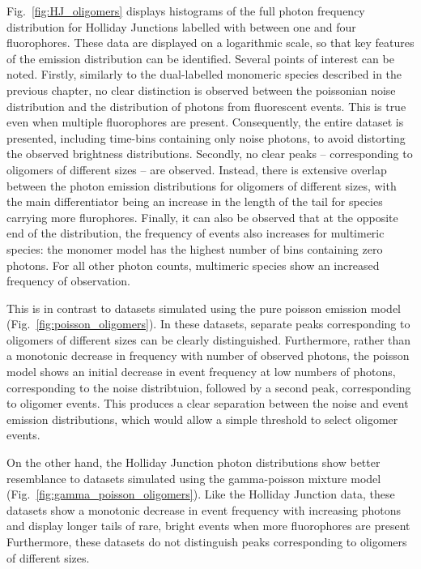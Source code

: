 Fig.~\ref{fig:HJ_oligomers} displays histograms of the full photon frequency distribution for Holliday Junctions labelled with between one and four fluorophores. These data are displayed on a logarithmic scale, so that key features of the emission distribution can be identified. Several points of interest can be noted. Firstly, similarly to the dual-labelled monomeric species described in the previous chapter, no clear distinction is observed between the poissonian noise distribution and the distribution of photons from fluorescent events. This is true even when multiple fluorophores are present. Consequently, the entire dataset is presented, including time-bins containing only noise photons, to avoid distorting the observed brightness distributions. Secondly, no clear peaks -- corresponding to oligomers of different sizes -- are observed. Instead, there is extensive overlap between the photon emission distributions for oligomers of different sizes, with the main differentiator being an increase in the length of the tail for species carrying more flurophores. Finally, it can also be observed that at the opposite end of the distribution, the frequency of events also increases for multimeric species: the monomer model has the highest number of bins containing zero photons. For all other photon counts, multimeric species show an increased frequency of observation. 

This is in contrast to datasets simulated using the pure poisson emission model (Fig.~\ref{fig:poisson_oligomers}). In these datasets, separate peaks corresponding to oligomers of different sizes can be clearly distinguished. Furthermore, rather than a monotonic decrease in frequency with number of observed photons, the poisson model shows an initial decrease in event frequency at low numbers of photons, corresponding to the noise distribtuion, followed by a second peak, corresponding to oligomer events. This produces a clear separation between the noise and event emission distributions, which would allow a simple threshold to select oligomer events. 

On the other hand, the Holliday Junction photon distributions show better resemblance to datasets simulated using the gamma-poisson mixture model (Fig.~\ref{fig:gamma_poisson_oligomers}). Like the Holliday Junction data, these datasets show a monotonic decrease in event frequency with increasing photons and display longer tails of rare, bright events when more fluorophores are present Furthermore, these datasets do not distinguish peaks corresponding to oligomers of different sizes. 

